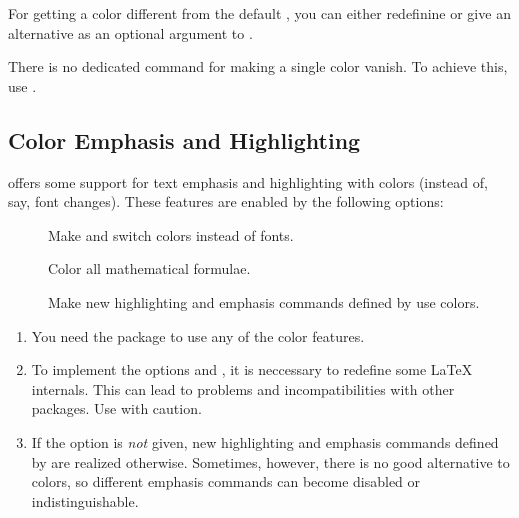 \begin{slide}
\begin{description}
    For getting a color different from the default , you can either redefinine 
    or give an alternative  as an optional argument to .

    There is no dedicated command for making a single color vanish. To achieve this, use
    .
  \end{description}


  \subsection{Color Emphasis and Highlighting}\label{Sec:ColorOptions}
   offers some support for text emphasis and highlighting with colors (instead of, say, font
  changes). These features are enabled by the following options:
  \begin{description}
  \item[]
    Make  and  switch colors instead of fonts.

  \item[]
    Color all mathematical formulae.

  \item[]
    Make new highlighting and emphasis commands defined by 
    use colors.
  \end{description}

  \begin{enumerate}
  \item You need the  package to use any of the color features.

  \item To implement the options  and , it is neccessary to redefine some \LaTeX{}
    internals. This can lead to problems and incompatibilities with other packages. Use with caution.

  \item If the  option is \emph{not} given, new highlighting and emphasis commands defined by
     are realized otherwise. Sometimes, however, there is no good alternative to colors, so different
    emphasis commands can become disabled or indistinguishable.


\end{enumerate}
\end{slide}
